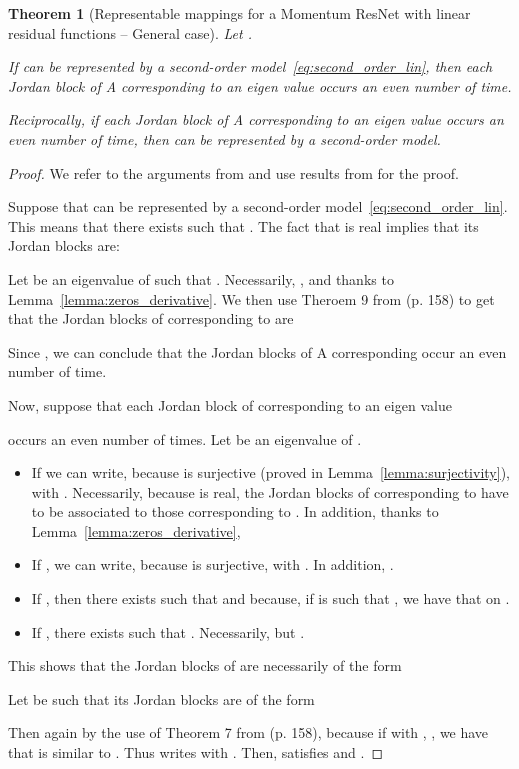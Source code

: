 \documentclass{article}
\newtheorem{theorem}{Theorem}
\begin{document}
\begin{theorem}[Representable mappings for a Momentum ResNet with linear residual functions -- General case]

Let .


If  can be represented by a second-order model~\eqref{eq:second_order_lin}, then each Jordan block of A corresponding to an eigen value   occurs an even number of time.

Reciprocally, if each Jordan block of A corresponding to an eigen value   occurs an even number of time, then  can be represented by a second-order model. 
\end{theorem}
\begin{proof}


We refer to the arguments from \citet{culver1966existence} and use results from \citet{gant} for the proof. 

Suppose that  can be represented by a second-order model~\eqref{eq:second_order_lin}. This means that there exists  such that . The fact that  is real implies that its Jordan blocks are:


Let  be an eigenvalue of  such that . Necessarily, , and  thanks to Lemma~\ref{lemma:zeros_derivative}. We then use Theroem 9 from \citet{gant} (p. 158) to get that the Jordan blocks of  corresponding to   are 

 Since  , we can conclude that the Jordan blocks of A corresponding  occur an even number of time.

Now, suppose that each Jordan block of  corresponding to an eigen value 

occurs an even number of times.
Let  be an eigenvalue of .
\begin{itemize}
    \item If   we can write, because  is surjective (proved in Lemma~\ref{lemma:surjectivity}),  with . Necessarily, because  is real, the Jordan blocks of  corresponding to  have to be associated to those corresponding to . In addition, thanks to Lemma~\ref{lemma:zeros_derivative},  
    \item If , we can write, because  is surjective,  with . In addition, .
    \item If , then there exists  such that  and  because, if  is such that , we have that  on .
     \item If , there exists  such that . Necessarily,  but .
\end{itemize}

This shows that the Jordan blocks of  are necessarily of the form 



Let  be such that its Jordan blocks are of the form 



 Then again by the use of Theorem 7 from \citet{gant} (p. 158), because if  with , , we have that  is similar to . 
 Thus  writes  with . 
 Then,  satisfies  and .
\end{proof}
\end{document}
